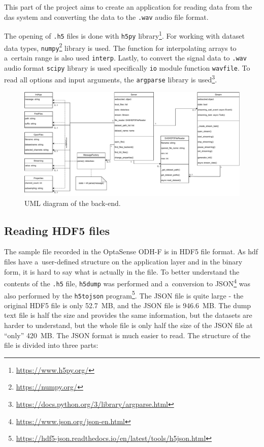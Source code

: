This part of the project aims to create an application for reading data from the \ac{das} system and converting the data to the \verb|.wav| audio file format.

The opening of \verb |.h5| files is done with \verb|h5py| library\footnote{\url{https://www.h5py.org/}}. For working with dataset data types, \verb|numpy|\footnote{\url{https://numpy.org/}} library is used. The function for interpolating arrays to a~certain range is also used \verb|interp|. Lastly, to convert the signal data to \verb|.wav| audio format \verb|scipy| library is used specifically \verb|io| module function \verb|wavfile|. To read all options and input arguments, the \verb|argparse| library is used\footnote{\url{https://docs.python.org/3/library/argparse.html}}.

\begin{figure}
    \centering
    \includegraphics[width=1.5\linewidth, angle=90]{pdf/diplomka_uml.drawio.pdf}
    \caption{UML diagram of the back-end.}
    \label{fig:uml}
\end{figure}

\subsection{Reading HDF5 files}\label{txt.implementation.reading}

The sample file recorded in the OptaSense ODH-F is in HDF5 file format. As \ac{hdf} files have a~user-defined structure on the application layer and in the binary form, it is hard to say what is actually in the file. To better understand the contents of the \verb|.h5| file, \verb|h5dump| was performed and a~conversion to JSON\footnote{\url{https://www.json.org/json-en.html}} was also performed by the \verb|h5tojson| program\footnote{\url{https://hdf5-json.readthedocs.io/en/latest/tools/h5json.html}}. The JSON file is quite large - the original HDF5 file is only \qty{52,7}{MB}, and the JSON file is \qty{946,6}{MB}. The dump text file is half the size and provides the same information, but the datasets are harder to understand, but the whole file is only half the size of the JSON file at ``only'' \qty{420}{MB}. The JSON format is much easier to read. The structure of the file is divided into three parts:

